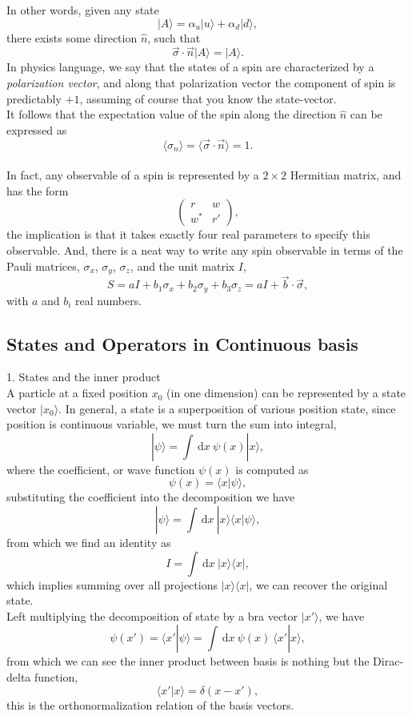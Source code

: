 \documentclass{article}
\newcommand{\be}{\begin{equation}}
\newcommand{\ee}{\end{equation}}
\newcommand{\ba}{\begin{array}}
\newcommand{\ea}{\end{array}}
\newcommand{\dif}{\,\mathrm{d}}
\renewcommand{\1}{\left}
\renewcommand{\2}{\right}
\newcommand{\la}{\langle}
\newcommand{\ra}{\rangle}
\newcommand{\al}{\alpha}
\newcommand{\sig}{\sigma}
\begin{document}
In other words, given any state
\be
|A\ra=\al_u|u\ra+\al_d|d\ra,
\ee
there exists some direction $\hat n$, such that
\be
\vec\sig\cdot\vec n|A\ra= |A\ra.
\ee
In physics language, we say that the states of a spin are characterized by a \textit{polarization vector}, and along that polarization vector the component of spin is predictably $+1$, assuming of course that you know the state-vector.\\ It follows that the expectation value of the spin along the direction $\hat n$ can be expressed as
\be
\la\sig_n\ra=\la \vec\sig\cdot\vec n\ra=1.
\ee\\

In fact, any observable of a spin is represented by a $2\times2$ Hermitian matrix, and has the form
\be
\1(\ba{cc}r&w\\w^*&r'\ea\2),
\ee
the implication is that it takes exactly four real parameters to specify this observable. And, there is a neat way to write any spin observable in terms of the Pauli matrices, $\sig_x$, $\sig_y$, $\sig_z$, and the unit matrix $I$,
\be S=a I+b_1\sig_x+b_2\sig_y+b_3\sig_z=a I+\vec b\cdot\vec \sig, \ee
with $a$ and $b_i$ real numbers.

\subsection{States and Operators in Continuous basis}
1. States and the inner product\\

A particle at a fixed position $x_0$ (in one dimension) can be represented by a state vector $|x_0\ra$. In general, a state is a superposition of various position state, since position is continuous variable, we must turn the sum into integral,
\be
|\psi\ra=\int \dif x \ \psi(x)|x\ra,
\ee
where the coefficient, or wave function $\psi(x)$ is computed as
\be
\psi(x)=\la x|\psi\ra,
\ee
substituting the coefficient into the decomposition we have
\be
|\psi\ra=\int \dif x \ |x\ra \la x|\psi\ra,
\ee
from which we find an identity as
\be
I=\int \dif x \ |x\ra \la x|,
\ee
which implies summing over all projections $|x\ra \la x|$, we can recover the original state.\\
Left multiplying the decomposition of state by a bra vector $|x'\ra$, we have
\be
\psi(x')=\la x'|\psi\ra=\int \dif x \ \psi(x)\ \la x'|x\ra,
\ee
from which we can see the inner product between basis is nothing but the Dirac-delta function,
\be
\la x'|x\ra=\delta(x-x'),
\ee
this is the orthonormalization relation of the basis vectors.\\
\end{document}
